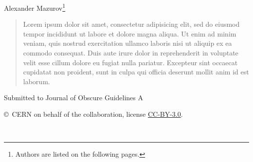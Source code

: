 \begin{titlepage}
\begin{center}
Alexander Mazurov\footnote{Authors are listed on the following pages.}
\end{center}

\vspace{\fill}

\begin{abstract}
  \noindent
  Lorem ipsum dolor sit amet, consectetur adipisicing elit, sed do eiusmod
  tempor incididunt ut labore et dolore magna aliqua. Ut enim ad minim veniam,
  quis nostrud exercitation ullamco laboris nisi ut aliquip ex ea commodo
  consequat. Duis aute irure dolor in reprehenderit in voluptate velit esse
  cillum dolore eu fugiat nulla pariatur. Excepteur sint occaecat cupidatat non
  proident, sunt in culpa qui officia deserunt mollit anim id est laborum.
\end{abstract}

\vspace*{2.0cm}

\begin{center}
  Submitted to Journal of Obscure Guidelines A
\end{center}

\vspace{\fill}

{\footnotesize 
\centerline{\copyright~CERN on behalf of the \lhcb collaboration, license \href{http://creativecommons.org/licenses/by/3.0/}{CC-BY-3.0}.}}
\vspace*{2mm}

\end{titlepage}



\newpage
\setcounter{page}{2}
\mbox{~}
\newpage

% 

\cleardoublepage







